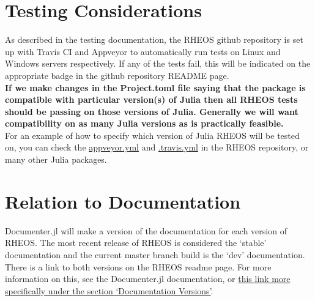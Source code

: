 \documentclass[]{article}
\newcommand{\link}[2]{{\color{blue}\href{#1}{#2}}}
\begin{document}
\section{Testing Considerations}
\label{sec:TC}
As described in the testing documentation, the RHEOS github repository is set up with Travis CI and Appveyor to automatically run tests on Linux and Windows servers respectively. If any of the tests fail, this will be indicated on the appropriate badge in the github repository README page.\\

\textbf{If we make changes in the Project.toml file saying that the package is compatible with particular version(s) of Julia then all RHEOS tests should be passing on those versions of Julia. Generally we will want compatibility on as many Julia versions as is practically feasible.}\\

For an example of how to specify which version of Julia RHEOS will be tested on, you can check the \link{https://github.com/JuliaRheology/RHEOS.jl/blob/master/appveyor.yml}{appveyor.yml} and \link{https://github.com/JuliaRheology/RHEOS.jl/blob/master/.travis.yml}{.travis.yml} in the RHEOS repository, or many other Julia packages.

\section{Relation to Documentation}
Documenter.jl will make a version of the documentation for each version of RHEOS. The most recent release of RHEOS is considered the `stable' documentation and the current master branch build is the `dev' documentation. There is a link to both versions on the RHEOS readme page. For more information on this, see the Documenter.jl documentation, or \link{https://juliadocs.github.io/Documenter.jl/stable/man/hosting/}{this link more specifically under the section `Documentation Versions'}.
\end{document}
